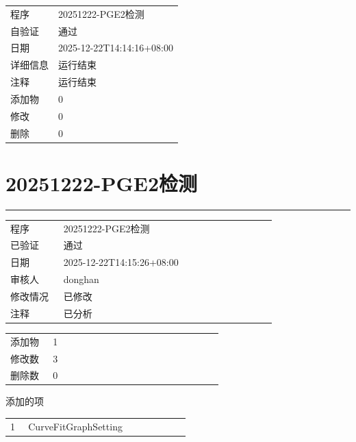 \documentclass[UTF8,10pt,a4paper,fontset=fandol]{ctexart}
\newcommand{\fieldvalue}[1]{#1}
\begin{document}
\begin{flushleft}
\begin{tabular}{@{}ll@{}}
程序 & 20251222-PGE2检测\\
自验证 & 通过\\
日期 & 2025-12-22T14:14:16+08:00\\
详细信息 & 运行结束\\
注释 & 运行结束\\
添加物 & 0\\
修改 & 0\\
删除 & 0
\end{tabular}
\end{flushleft}
\normalsize

\newpage

\section*{20251222-PGE2检测}

\noindent\rule{\linewidth}{0.4pt}

\begin{tabular}{@{}p{0.18\linewidth}p{0.72\linewidth}@{}}
程序 &
\fieldvalue{20251222-PGE2检测}
\\
已验证 &
\fieldvalue{通过}
\\
日期 &
\fieldvalue{2025-12-22T14:15:26+08:00}
\\
审核人 &
\fieldvalue{donghan}
\\
修改情况 &
\fieldvalue{已修改}
\\
注释 &
\fieldvalue{已分析}
\end{tabular}

\bigskip

\begin{tabular}{@{}p{0.18\linewidth}p{0.72\linewidth}@{}}
添加物 &
\fieldvalue{1}
\\
修改数 &
\fieldvalue{3}
\\
删除数 &
\fieldvalue{0}
\end{tabular}

\bigskip

\noindent 添加的项

\begin{tabular}{@{}p{0.08\linewidth}p{0.72\linewidth}@{}}
1 &
\fieldvalue{CurveFitGraphSetting}
\end{tabular}
\end{document}
